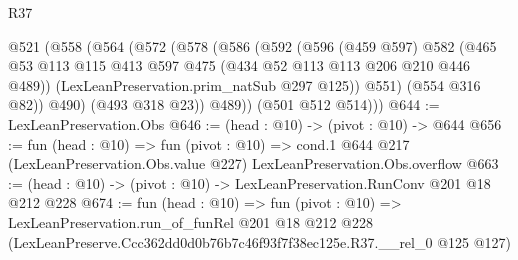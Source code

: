 \begin{lexlean}{R37}
\begin{coremodule}
      @521
        (@558
          (@564
            (@572
              (@578
                (@586
                  (@592
                    (@596
                      (@459 @597)
                      @582
                      (@465 @53 @113 @115 @413 @597 @475 (@434 @52 @113 @113 @206 @210 @446 @489))
                      (LexLeanPreservation.prim_natSub @297 @125))
                    @551)
                  (@554 @316 @82))
                @490)
              (@493 @318 @23))
            @489))
        (@501 @512 @514)))
@644 := LexLeanPreservation.Obs
@646 := (head : @10) -> (pivot : @10) -> @644
@656 := fun (head : @10) =>
  fun (pivot : @10) =>
  cond.{1} @644 @217 (LexLeanPreservation.Obs.value @227) LexLeanPreservation.Obs.overflow
@663 := (head : @10) -> (pivot : @10) -> LexLeanPreservation.RunConv @201 @18 @212 @228
@674 := fun (head : @10) =>
  fun (pivot : @10) =>
  LexLeanPreservation.run_of_funRel
    @201
    @18
    @212
    @228
    (LexLeanPreserve.Ccc362dd0d0b76b7c46f93f7f38ec125e.R37.__rel_0 @125 @127)
\end{coremodule}
\end{lexlean}
